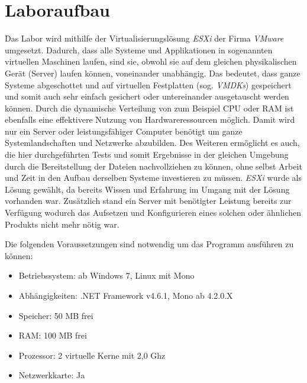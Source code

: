 \section{Laboraufbau} \label{Laboraufbau}
    Das Labor wird mithilfe der Virtualisierungslösung \emph{ESXi} %
    der Firma \emph{VMware} umgesetzt. Dadurch, dass alle Systeme und Applikationen in sogenannten virtuellen Maschinen laufen, sind sie, obwohl sie auf dem gleichen physikalischen Gerät (Server) laufen können, voneinander unabhängig. Das bedeutet, dass ganze Systeme abgeschottet und auf virtuellen Festplatten (sog. \emph{\acp{VMDK}}) gespeichert und somit auch sehr einfach gesichert oder untereinander ausgetauscht werden können. Durch die dynamische Verteilung von zum Beispiel \ac{CPU} oder RAM ist ebenfalls eine effektivere Nutzung von Hardwareressourcen möglich. Damit wird nur ein Server oder leistungsfähiger Computer benötigt um ganze Systemlandschaften und Netzwerke abzubilden. Des Weiteren ermöglicht es auch, die hier durchgeführten Tests und somit Ergebnisse in der gleichen Umgebung durch die Bereitstellung der Dateien nachvollziehen zu können, ohne selbst Arbeit und Zeit in den Aufbau derselben Systeme investieren zu müssen.
    \emph{ESXi} wurde als Lösung gewählt, da bereits Wissen und Erfahrung im Umgang mit der Lösung vorhanden war. Zusätzlich stand ein Server mit benötigter Leistung bereits zur Verfügung wodurch das Aufsetzen und Konfigurieren eines solchen oder ähnlichen Produkts nicht mehr nötig war.
    
    Die folgenden Voraussetzungen sind notwendig um das Programm ausführen zu können:
    \begin{itemize}
        \item Betriebssystem: ab Windows 7, Linux mit Mono
        \item Abhängigkeiten: .NET Framework v4.6.1, Mono ab 4.2.0.X
        \item Speicher: 50 \ac{MB} frei
        \item RAM: 100 \ac{MB} frei
        \item Prozessor: 2 virtuelle Kerne  mit 2,0 Ghz
        \item Netzwerkkarte: Ja
    \end{itemize}
    
